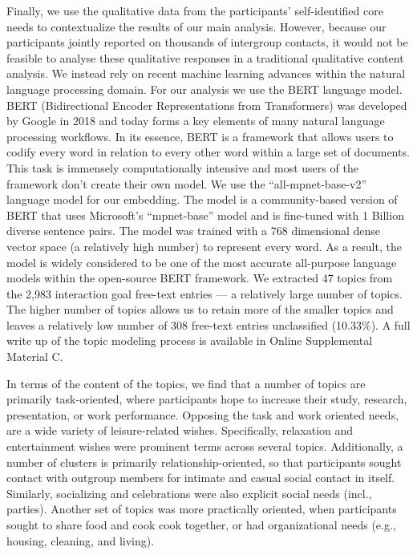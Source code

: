 Finally, we use the qualitative data from the participants'
self-identified core needs to contextualize the results of our main
analysis. However, because our participants jointly reported on
thousands of intergroup contacts, it would not be feasible to analyse
these qualitative responses in a traditional qualitative content
analysis. We instead rely on recent machine learning advances within the
natural language processing domain. For our analysis we use the BERT
language model. BERT (Bidirectional Encoder Representations from
Transformers) was developed by Google in 2018 and today forms a key
elements of many natural language processing workflows. In its essence,
BERT is a framework that allows users to codify every word in relation
to every other word within a large set of documents. This task is
immensely computationally intensive and most users of the framework
don't create their own model. We use the ``all-mpnet-base-v2'' language
model for our embedding. The model is a community-based version of BERT
that uses Microsoft's ``mpnet-base'' model and is fine-tuned with 1
Billion diverse sentence pairs. The model was trained with a 768
dimensional dense vector space (a relatively high number) to represent
every word. As a result, the model is widely considered to be one of the
most accurate all-purpose language models within the open-source BERT
framework. We extracted 47 topics from the 2,983 interaction goal
free-text entries --- a relatively large number of topics. The higher
number of topics allows us to retain more of the smaller topics and
leaves a relatively low number of 308 free-text entries unclassified
(10.33\%). A full write up of the topic modeling process is available in
Online Supplemental Material C.

In terms of the content of the topics, we find that a number of topics
are primarily task-oriented, where participants hope to increase their
study, research, presentation, or work performance. Opposing the task
and work oriented needs, are a wide variety of leisure-related wishes.
Specifically, relaxation and entertainment wishes were prominent terms
across several topics. Additionally, a number of clusters is primarily
relationship-oriented, so that participants sought contact with outgroup
members for intimate and casual social contact in itself. Similarly,
socializing and celebrations were also explicit social needs (incl.,
parties). Another set of topics was more practically oriented, when
participants sought to share food and cook cook together, or had
organizational needs (e.g., housing, cleaning, and living).

